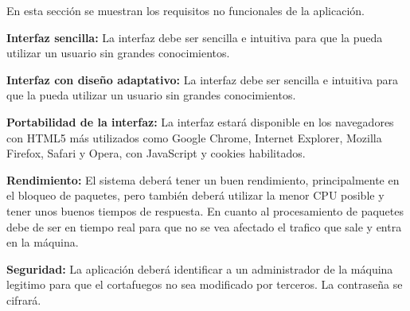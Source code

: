 En esta sección se muestran los requisitos no funcionales de la aplicación.
\begin{nonfunctional}
        
        \item \textbf{Interfaz sencilla:} La interfaz debe ser sencilla e intuitiva para que la pueda utilizar un usuario sin grandes conocimientos.
        \item \textbf{Interfaz con diseño adaptativo:} La interfaz debe ser sencilla e intuitiva para que la pueda utilizar un usuario sin grandes conocimientos.
        \item \textbf{Portabilidad de la interfaz:} La interfaz estará disponible en los navegadores con HTML5 más utilizados como Google Chrome, Internet Explorer, Mozilla Firefox, Safari y Opera, con JavaScript y cookies habilitados.
        \item \textbf{Rendimiento:} El sistema deberá tener un buen rendimiento, principalmente en el bloqueo de paquetes, pero también deberá utilizar la menor CPU posible y tener unos buenos tiempos de respuesta. En cuanto al procesamiento de paquetes debe de ser en tiempo real para que no se vea afectado el trafico que sale y entra en la máquina.
        \item \textbf{Seguridad:} La aplicación deberá identificar a un administrador de la máquina legitimo para que el cortafuegos no sea modificado por terceros. La contraseña se cifrará.
        
        
\end{nonfunctional}

